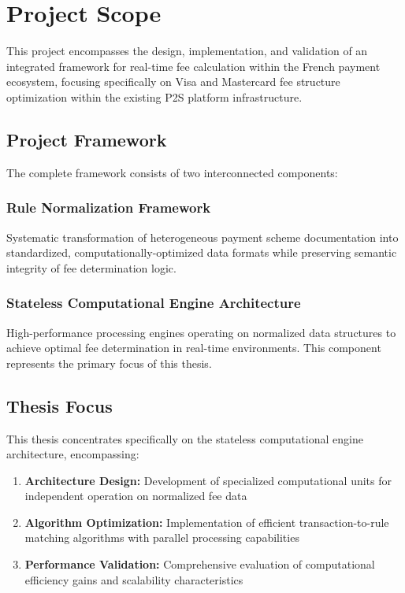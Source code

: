 \section{Project Scope}

This project encompasses the design, implementation, and validation of an integrated framework for real-time fee calculation within the French payment ecosystem, focusing specifically on Visa and Mastercard fee structure optimization within the existing P2S platform infrastructure.

\subsection{Project Framework}

The complete framework consists of two interconnected components:

\subsubsection{Rule Normalization Framework}
Systematic transformation of heterogeneous payment scheme documentation into standardized, computationally-optimized data formats while preserving semantic integrity of fee determination logic.

\subsubsection{Stateless Computational Engine Architecture}
High-performance processing engines operating on normalized data structures to achieve optimal fee determination in real-time environments. This component represents the primary focus of this thesis.

\subsection{Thesis Focus}

This thesis concentrates specifically on the stateless computational engine architecture, encompassing:

\begin{enumerate}
    \item \textbf{Architecture Design:} Development of specialized computational units for independent operation on normalized fee data
    \item \textbf{Algorithm Optimization:} Implementation of efficient transaction-to-rule matching algorithms with parallel processing capabilities
    \item \textbf{Performance Validation:} Comprehensive evaluation of computational efficiency gains and scalability characteristics
\end{enumerate}

